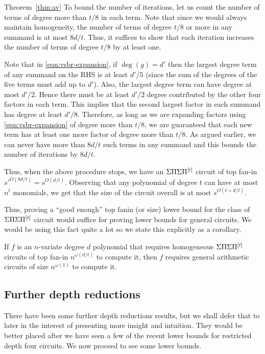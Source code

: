 \begin{proofof}{Theorem~\ref{thm:av}}
To bound the number of iterations, let us count the number of terms of degree more than $t/8$ in each term. Note that since we would always maintain homogeneity, the number of terms of degree  $t/8$ or more in any summand  is at most $8d/t$. Thus, it suffices to show that each iteration increases the number of terms of degree $t/8$ by at least one. 

Note that in \eqref{eqn:vsbr-expansion}, if $\deg(g) = d'$ then the largest degree term of any summand on the RHS is at least $d'/5$ (since the sum of the degrees of the five terms must add up to $d'$). Also, the largest degree term can have degree at most $d'/2$. Hence there must be at least $d'/2$ degree contributed by the other four factors in each term. This implies that the second largest factor in each summand has degree at least $d'/8$. Therefore, as long as we are expanding factors using \eqref{eqn:vsbr-expansion} of degree more than $t/8$, we are guaranteed that each new term has at least one more factor of degree more than $t/8$. As argued earlier, we can never have more than $8d/t$ such terms in any summand and this bounds the number of iterations by $8d/t$. 

Thus, when the above procedure stops, we have an $\Sigma\Pi\Sigma\Pi^{[t]}$ circuit of top fan-in $s'^{O(8d/t)} = s^{O(d/t)}$. Observing that any polynomial of degree $t$ can have at most $n^t$ monomials, we get that the size of the circuit overall is at most $s^{O(t + d/t)}$. 
\end{proofof}

Thus, proving a ``good enough'' top fanin (or size) lower bound for the class of $\Sigma\Pi\Sigma\Pi^{[t]}$ circuit would suffice for proving lower bounds for general circuits. We would be using this fact quite a lot so we state this explicitly as a corollary. 

\begin{corollary}\label{cor:av}
If $f$ is an $n$-variate degree $d$ polynomial that requires homogeneous $\Sigma\Pi\Sigma\Pi^{[t]}$ circuits of top fan-in $n^{\omega(d/t)}$ to compute it, then $f$ requires general arithmetic circuits of size $n^{\omega(1)}$ to compute it. 
\end{corollary}

\subsection*{Further depth reductions}

There have been some further depth reductions results, but we shall defer that to later in the interest of presenting more insight and intuition. They would be better placed after we have seen a few of the recent lower bounds for restricted depth four circuits. We now proceed to see some lower bounds. 



